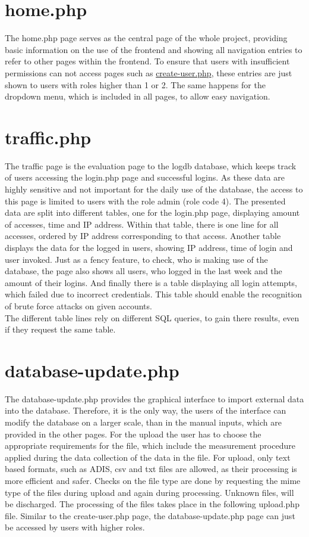 
\section{home.php}

The home.php page serves as the central page of the whole project, providing basic information on the use of the frontend and showing all navigation entries to refer to other pages 
within the frontend. To ensure that users with insufficient permissions can not access pages such as \hyperref[create-user.php]{create-user.php}, these entries are just shown to users with roles 
higher than 1 or 2. The same happens for the dropdown menu, which is included in all pages, to allow easy navigation. 

\section{traffic.php}
The traffic page is the evaluation page to the logdb database, which keeps track of users accessing the login.php page and successful logins. As these data are highly sensitive and 
not important for the daily use of the database, the access to this page is limited to users with the role admin (role code 4). The presented data are split into different tables, 
one for the login.php page, displaying amount of accesses, time and IP address. Within that table, there is one line for all accesses, ordered by IP address corresponding to that access. 
Another table displays the data for the logged in users, showing IP address, time of login and user invoked. Just as a fency feature, to check, who is making use of the database, the page also 
shows all users, who logged in the last week and the amount of their logins. And finally there is a table displaying all login attempts, which failed due to 
incorrect credentials. This table should enable the recognition of brute force attacks on given accounts.\\
The different table lines rely on different SQL queries, to gain there results, even if they request the same table.

\section{database-update.php}
The database-update.php provides the graphical interface to import external data into the database. Therefore, it is the only way, the users of the interface can modify the database 
on a larger scale, than in the manual inputs, which are provided in the other pages. For the upload the user has to choose the appropriate requirements for the file, which include the 
measurement procedure applied during the data collection of the data in the file. For upload, only text based formats, such as ADIS, csv and txt files are allowed, as their processing is more 
efficient and safer. Checks on the file type are done by requesting the mime type of the files during upload and again during processing. Unknown files, will be discharged. 
The processing of the files takes place in the following upload.php file. Similar to the create-user.php page, the database-update.php page can just be accessed by users with higher roles. 

